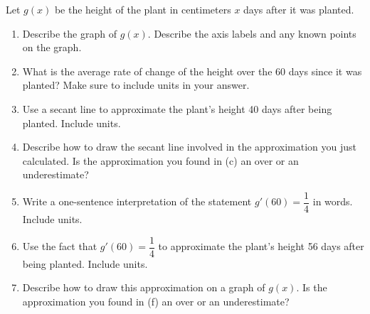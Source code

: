 \documentclass{article}
\begin{document}
\begin{enumerate}
Let $g(x)$ be the height of the plant in centimeters $x$ days after it was planted.  
\begin{enumerate}
    \item  
    \begin{problem}[\vfill] Describe the graph of $g(x)$. Describe the axis labels and any known points on the graph.
    \end{problem}
    \item 
    \begin{problem}[1.5in] What is the average rate of change of the height over the 60 days since it was planted? Make sure to include units in your answer.
    \end{problem}

    \newpage
    \item 
    \begin{problem}[\vfill]
        Use a secant line to approximate the plant's height 40 days after being planted. Include units. 
    \end{problem}
    \item 
    \begin{problem}[\vfill] Describe how to draw the secant line involved in the approximation you just calculated. Is the approximation you found in (c) an over or an underestimate? 
    
    \end{problem}
    \item 
    \begin{problem}[\vfill] Write a one-sentence interpretation of the statement $g'(60)=\dfrac{1}{4}$ in words. Include units. 
    \end{problem}
    \item 
    \begin{problem}[\vfill] Use the fact that $g'(60)=\dfrac{1}{4}$ to approximate the plant's height 56 days after being planted. Include units.
    \end{problem}
    \item 
    \begin{problem}[\vfill] Describe how to draw this approximation on a graph of $g(x)$. Is the approximation you found in (f) an over or an underestimate? 
    

\end{problem}
\end{enumerate}
\end{enumerate}
\end{document}
